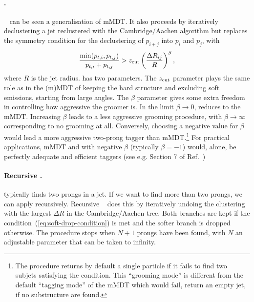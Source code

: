 \paragraph{\SD.} \SD~\cite{Larkoski:2014wba} can be seen a
generalisation of mMDT. It also proceeds by
iteratively declustering a jet reclustered with the Cambridge/Aachen
algorithm but replaces the symmetry condition for the
declustering of $p_{i+j}$ into $p_i$ and $p_j$, with
\begin{equation}\label{eq:soft-drop-condition}
  \frac{{\rm min}(p_{t,i},p_{t,j})}{p_{t,i}+p_{t,j}} 
    > z_{\text{cut}} \left(\frac{\Delta R_{ij}}{R}\right)^\beta,
\end{equation}
where $R$ is the jet radius.
%
\SD has two parameters. The $z_{\text{cut}}$ parameter plays the same role as
in the (m)MDT of keeping the hard structure and excluding soft
emissions, starting from large angles.
%
The $\beta$ parameter gives \SD some extra freedom in controlling how
aggressive the groomer is.
%
In the limit $\beta\to 0$, \SD reduces to the mMDT. Increasing $\beta$
leads to a less aggressive grooming procedure, with $\beta \to \infty$
corresponding to no grooming at all. Conversely, choosing a negative
value for $\beta$ would lead a more aggressive two-prong tagger than
mMDT.\footnote{The \SD procedure returns by default a single particle
  if it fails to find two subjets satisfying the \SD condition. This
  ``grooming mode'' is different from the default ``tagging mode'' of
  the mMDT which would fail, \ie return an empty jet, if no
  substructure are found.}
%
For practical applications, mMDT and \SD with negative $\beta$
(typically $\beta=-1$) would, alone, be perfectly adequate and
efficient taggers (see e.g. Section 7 of Ref.~\cite{Larkoski:2014wba})

\paragraph{Recursive \SD.} \SD typically finds two prongs in a jet. If we want to find more than two prongs, we can apply \SD
recursively. Recursive \SD~\cite{Dreyer:2018tjj} does this by
iteratively undoing the clustering with the largest $\Delta R$ in the
Cambridge/Aachen tree. Both branches are kept if the \SD
condition~(\ref{eq:soft-drop-condition}) is met and the softer branch
is dropped otherwise. The procedure stops when $N+1$ prongs have been
found, with $N$ an adjustable parameter that can be taken to infinity.

